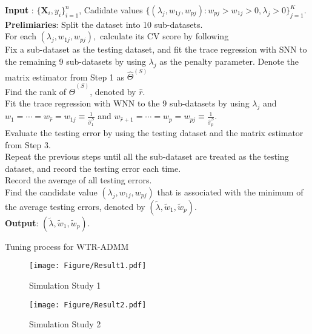 \documentclass[12pt]{article}
\begin{document}
\begin{algorithm}[h] \label{alg:2}
    \textbf{Input} : $\big\{\mathbf{X}_{i},y_{i}\big\}_{i=1}^{n}$, Cadidate values $\{(\lambda_{j}, w_{1j}, w_{pj}): w_{pj} > w_{1j} > 0, \lambda_{j} > 0\}^{K}_{j=1}$. \\
    \textbf{Prelimiaries}: Split the dataset into 10 sub-datasets. \\
    For each $(\lambda_{j}, w_{1j}, w_{pj}),$ calculate its CV score by
    following \\
     Fix a sub-dataset as the testing dataset, and fit the trace regression with SNN to the remaining 9 sub-datasets by using $\lambda_{j}$ as the penalty parameter.
    Denote the matrix estimator from Step 1 as $\hat{\Theta}^{(S)}$\\
     Find the rank of $\hat{\Theta}^{(S)}$, denoted by $\hat{r}$.\\
     Fit the trace regression with WNN to the 9 sub-datasets by using $\lambda_{j}$ and $w_{1} = \cdots = w_{\hat{r}} = w_{1j} \equiv \frac{1}{\hat{\sigma}^{S}_{1}}$ and $w_{\hat{r} + 1} = \cdots = w_{p} = w_{pj}  \equiv \frac{1}{\hat{\sigma}^{S}_{p}}$.\\
      Evaluate the testing error by using the testing dataset and the matrix estimator from Step 3.\\
     Repeat the previous steps until all the sub-dataset are treated as the testing dataset, and record the testing error each time.\\
     Record the average of all testing errors.\\
    Find the candidate value $(\lambda_{j}, w_{1j}, w_{pj})$ that is associated with the minimum of the average testing errors, denoted by $(\tilde{\lambda}, \tilde{w}_{1}, \tilde{w}_{p})$.\\
\textbf{Output}: $(\tilde{\lambda}, \tilde{w}_{1}, \tilde{w}_{p})$. 
\caption{Tuning process for WTR-ADMM}
\end{algorithm}

\begin{figure}[htbp]
\centering
  \texttt{[image: Figure/Result1.pdf]}
  \caption{Simulation Study 1} 
  \label{fig_1}
\end{figure}

\begin{figure}[htbp]
\centering
  \texttt{[image: Figure/Result2.pdf]}
  \caption{Simulation Study 2} 
  \label{fig_1}
\end{figure}
\end{document}
